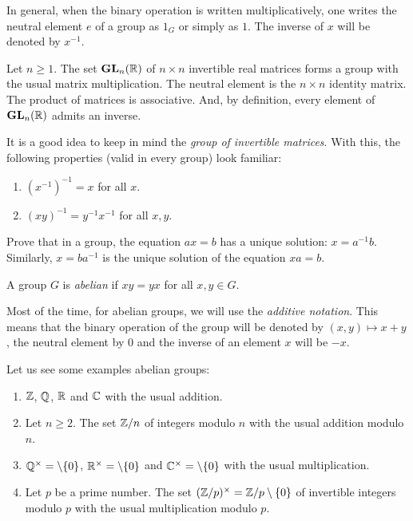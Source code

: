 In general, when the binary operation is written multiplicatively, one
writes the neutral element $e$ of a group as $1_G$ or simply as $1$. The inverse of $x$ will be 
denoted by $x^{-1}$. 

\begin{example}
    Let $n\geq1$. The set $\mathbf{GL}_n(\mathbb{R})$ of $n\times n$ invertible real 
matrices forms a
    group with the usual matrix multiplication. The neutral element is the $n\times n$ 
    identity matrix. The product 
    of matrices is associative. And, by definition, every element of $\mathbf{GL}_n(\mathbb{R})$ admits an inverse. 
\end{example}

It is a good idea to keep in mind the \emph{group of invertible matrices}. 
With this, the following properties (valid in every group) look familiar:
\begin{enumerate}
    \item $(x^{-1})^{-1}=x$ for all $x$.
    \item $(xy)^{-1}=y^{-1}x^{-1}$ for all $x,y$. 
\end{enumerate}

\begin{exercise}
\label{xca:ax=b}
    Prove that in a group, the equation $ax=b$ has 
    a unique solution: $x=a^{-1}b$. Similarly, 
    $x=ba^{-1}$ is the unique solution of the equation
    $xa=b$. 
\end{exercise}

\begin{definition}
    A group $G$ is \emph{abelian} if $xy=yx$ for all $x,y\in G$. 
\end{definition}

Most of the time, for abelian groups, we will use 
the \emph{additive notation}. This means that the binary operation
of the group will be denoted by $(x,y)\mapsto x+y$, the neutral
element by $0$ and 
the inverse of an element $x$ will be $-x$. 

\begin{example}
\label{exa:abelian_groups}
    Let us see some examples 
    abelian groups: 
    \begin{enumerate}
        \item $\mathbb{Z}$, $\mathbb{Q}$, $\mathbb{R}$ and $\mathbb{C}$ with the usual addition. 
        \item Let $n\geq2$. The set $\mathbb{Z}/n$ of integers modulo $n$ with the usual addition modulo $n$.
        \item $\mathbb{Q}^\times=\setminus\{0\}$, $\mathbb{R}^\times=\setminus\{0\}$ and $\mathbb{C}^\times=\setminus\{0\}$ 
        with the usual multiplication.
        \item Let $p$ be a prime number. The set $(\mathbb{Z}/p)^{\times}=\mathbb{Z}/p\setminus\{0\}$ of invertible integers modulo $p$ 
            with the usual multiplication modulo $p$. 
    \end{enumerate}
\end{example}

